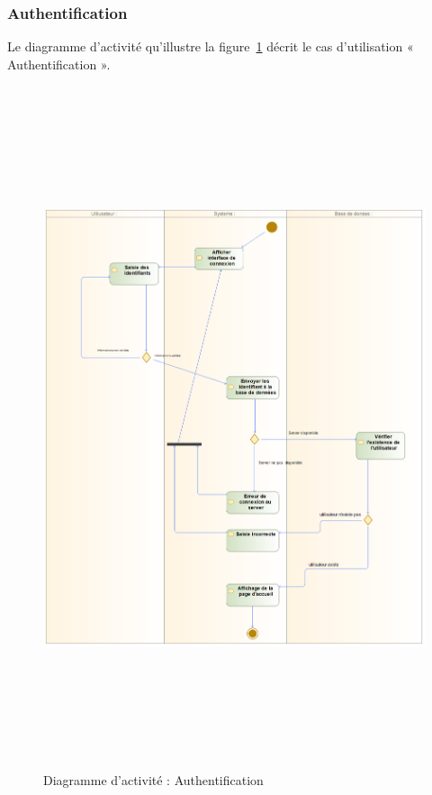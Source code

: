 \subsubsection{Authentification}
Le diagramme d’activité qu’illustre la figure~\ref{activiteAuth} décrit le cas d’utilisation « Authentification ».
\begin{figure}[h!]
	\includegraphics[width=18cm, height=20cm]{./Template LaTeX/Images/auth_act.png}
	\caption{Diagramme d'activité : Authentification}
	\label{activiteAuth}
\end{figure}



